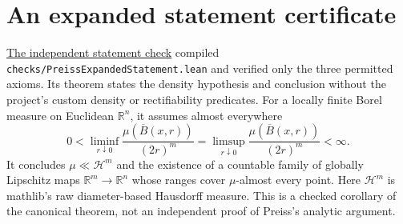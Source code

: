 \section{An expanded statement certificate}
\href{https://github.com/tdwag123/PreissFormalization/actions/runs/43657201334}{The independent statement check}
compiled \texttt{checks/PreissExpandedStatement.lean} and verified only the
three permitted axioms. Its theorem states the density hypothesis and
conclusion without the project's custom density or rectifiability predicates.
For a locally finite Borel measure on Euclidean $\mathbb R^n$, it assumes
almost everywhere
\[
 0 < \liminf_{r\downarrow0}\frac{\mu(\overline B(x,r))}{(2r)^m}
   = \limsup_{r\downarrow0}\frac{\mu(\overline B(x,r))}{(2r)^m}<\infty.
\]
It concludes $\mu\ll\mathcal H^m$ and the existence of a countable family
of globally Lipschitz maps $\mathbb R^m\to\mathbb R^n$ whose ranges cover
$\mu$-almost every point. Here $\mathcal H^m$ is mathlib's raw
diameter-based Hausdorff measure.
This is a checked corollary of the canonical theorem, not an independent
proof of Preiss's analytic argument.

